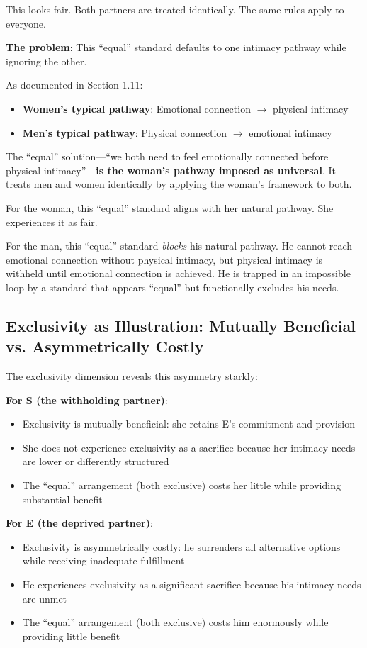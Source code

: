 \documentclass[12pt,openany]{book}
\numberwithin{equation}{chapter}
\begin{document}
This looks fair. Both partners are treated identically. The same rules apply to everyone.

\textbf{The problem}: This ``equal'' standard defaults to one intimacy pathway while ignoring the other.

As documented in Section 1.11:
\begin{itemize}
    \item \textbf{Women's typical pathway}: Emotional connection $\rightarrow$ physical intimacy
    \item \textbf{Men's typical pathway}: Physical connection $\rightarrow$ emotional intimacy
\end{itemize}

The ``equal'' solution---``we both need to feel emotionally connected before physical intimacy''---\textbf{is the woman's pathway imposed as universal}. It treats men and women identically by applying the woman's framework to both.

For the woman, this ``equal'' standard aligns with her natural pathway. She experiences it as fair.

For the man, this ``equal'' standard \textit{blocks} his natural pathway. He cannot reach emotional connection without physical intimacy, but physical intimacy is withheld until emotional connection is achieved. He is trapped in an impossible loop by a standard that appears ``equal'' but functionally excludes his needs.

\subsection{Exclusivity as Illustration: Mutually Beneficial vs. Asymmetrically Costly}

The exclusivity dimension reveals this asymmetry starkly:

\textbf{For S (the withholding partner)}:
\begin{itemize}
    \item Exclusivity is mutually beneficial: she retains E's commitment and provision
    \item She does not experience exclusivity as a sacrifice because her intimacy needs are lower or differently structured
    \item The ``equal'' arrangement (both exclusive) costs her little while providing substantial benefit
\end{itemize}

\textbf{For E (the deprived partner)}:
\begin{itemize}
    \item Exclusivity is asymmetrically costly: he surrenders all alternative options while receiving inadequate fulfillment
    \item He experiences exclusivity as a significant sacrifice because his intimacy needs are unmet
    \item The ``equal'' arrangement (both exclusive) costs him enormously while providing little benefit
\end{itemize}
\end{document}
